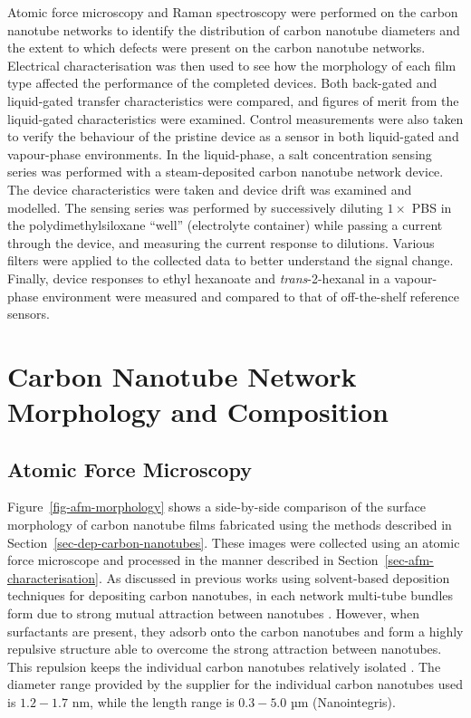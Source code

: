 \documentclass[
  a4paper,
]{scrbook}
\begin{document}
Atomic force microscopy and Raman spectroscopy were performed on the
carbon nanotube networks to identify the distribution of carbon nanotube
diameters and the extent to which defects were present on the carbon
nanotube networks. Electrical characterisation was then used to see how
the morphology of each film type affected the performance of the
completed devices. Both back-gated and liquid-gated transfer
characteristics were compared, and figures of merit from the
liquid-gated characteristics were examined. Control measurements were
also taken to verify the behaviour of the pristine device as a sensor in
both liquid-gated and vapour-phase environments. In the liquid-phase, a
salt concentration sensing series was performed with a steam-deposited
carbon nanotube network device. The device characteristics were taken
and device drift was examined and modelled. The sensing series was
performed by successively diluting \(1 \times\) PBS in the
polydimethylsiloxane ``well'' (electrolyte container) while passing a
current through the device, and measuring the current response to
dilutions. Various filters were applied to the collected data to better
understand the signal change. Finally, device responses to ethyl
hexanoate and \emph{trans}-2-hexanal in a vapour-phase environment were
measured and compared to that of off-the-shelf reference sensors.

\hypertarget{sec-pristine-morphology}{%
\section{Carbon Nanotube Network Morphology and
Composition}\label{sec-pristine-morphology}}

\hypertarget{sec-pristine-AFM}{%
\subsection{Atomic Force Microscopy}\label{sec-pristine-AFM}}

Figure~\ref{fig-afm-morphology} shows a side-by-side comparison of the
surface morphology of carbon nanotube films fabricated using the methods
described in Section~\ref{sec-dep-carbon-nanotubes}. These images were
collected using an atomic force microscope and processed in the manner
described in Section~\ref{sec-afm-characterisation}. As discussed in
previous works using solvent-based deposition techniques for depositing
carbon nanotubes, in each network multi-tube bundles form due to strong
mutual attraction between nanotubes
\autocite{Zheng2017,Murugathas2018,Murugathas2019,Nguyen2021}. However,
when surfactants are present, they adsorb onto the carbon nanotubes and
form a highly repulsive structure able to overcome the strong attraction
between nanotubes. This repulsion keeps the individual carbon nanotubes
relatively isolated
\autocite{Wenseleers2004,Gavrel2013,Hermanson2013-16,Shimizu2013,DiCrescenzo2014,Yang2023}.
The diameter range provided by the supplier for the individual carbon
nanotubes used is \(1.2-1.7\) nm, while the length range is \(0.3-5.0\)
µm (Nanointegris).
\end{document}
